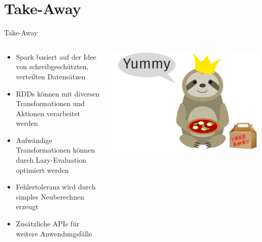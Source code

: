 \section{Take-Away}
\begin{frame}{Take-Away}
	\begin{columns}
		\begin{column}{0.75\textwidth}
			\begin{itemize}
				\item Spark basiert auf der Idee von schreibgeschützten, verteilten Datensätzen
				\item RDDs können mit diversen Transformationen und Aktionen verarbeitet werden
				\item Aufwändige Transformationen können durch Lazy-Evaluation optimiert werden
				\item Fehlertoleranz wird durch simples Neuberechnen erzeugt
				\item Zusätzliche APIs für weitere Anwendungsfälle
			\end{itemize}
		\end{column}
		\begin{column}{0.25\textwidth}
			\includegraphics[width=\textwidth]{pics/sloth.png}\\
		\end{column}
	\end{columns}
\end{frame}
